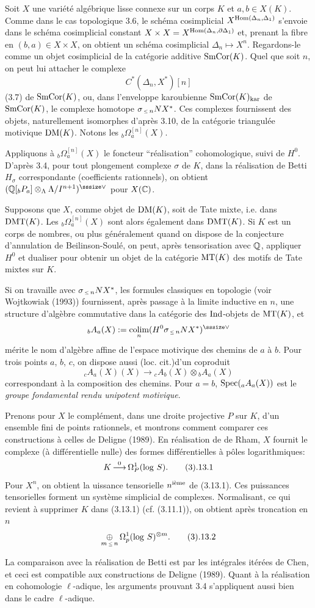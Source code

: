 \endsubhead
Soit $X$ une vari\'et\'e alg\'ebrique lisse
connexe sur un corps $K$ et $a,b\in X(K)$.
Comme dans le cas topologique 3.6, le sch\'ema
cosimplicial $X^{\text{\rm Hom}(\Delta_n,\Delta_1)}$
s'envoie dans le sch\'ema cosimplicial constant
$X\times
X=X^{\text{\rm Hom}(\Delta_n,\partial\Delta_1)}$ et,
prenant la fibre en $(b,a)\in X\times X$, on
obtient un sch\'ema cosimplicial
$\Delta_n\mapsto X^n$.
Regardons-le comme un objet cosimplicial de la
cat\'egorie additive $\text{\rm SmCor}(K)$.
Quel que soit $n$, on peut lui attacher le
complexe
$$
C^*(\Delta_n,X^*)[n]
$$
(3.7) de $\text{\rm SmCor}(K)$, ou, dans l'enveloppe
karoubienne $\text{\rm SmCor}(K)_{\text{\rm kar}}$ de $\text{\rm SmCor}(K)$,
le complexe homotope $\sigma_{\Le n}NX^*$.
Ces complexes fournissent des objets,
naturellement isomorphes d'apr\`es 3.10, de la
cat\'egorie triangul\'ee motivique $\text{\rm DM}(K)$.
Notons les ${}_b\Omega_a^{[n]}(X)$.

Appliquons \`a ${}_b\Omega_a^{[n]}(X)$ le
foncteur ``r\'ealisation''  cohomologique,
suivi de $H^0$.
D'apr\`es 3.4, pour tout plongement complexe
$\sigma$ de $K$, dans la r\'ealisation de
Betti $H_\sigma$ correspondante (coefficients
rationnels), on obtient
$(\dbQ[{}_bP_a]\otimes_\Lambda
\Lambda/I^{n+1})\upvee$ pour $X({\Bbb C})$.

Supposons que $X$, comme objet de $\text{\rm DM}(K)$,
soit de Tate mixte, i.e. dans $\text{\rm DMT}(K)$.
Les ${}_b\Omega_a^{[n]}(X)$ sont alors
\'egalement dans $\text{\rm DMT}(K)$.
Si $K$ est un corps de nombres, ou plus
g\'en\'eralement quand on dispose de la
conjecture d'annulation de Beilinson-Soul\'e,
on peut, apr\`es tensorisation avec ${\Bbb Q}$,
appliquer $H^0$ et dualiser pour obtenir un
objet de la cat\'egorie $\text{\rm MT}(K)$ des motifs de
Tate mixtes sur $K$.

Si on travaille avec $\sigma_{\Le n}NX^*$, les
formules classiques en topologie (voir 
Wojtkowiak (1993)) fournissent, apr\`es
passage \`a la limite inductive en $n$, une
structure d'alg\`ebre commutative dans la
cat\'egorie des $\text{\rm Ind}$-objets de $\text{\rm MT}(K)$, et
$$
{}_bA_a(X):=\colim_n(H^0\sigma_{\Le
n}NX^*)\upvee
$$
m\'erite le nom d'alg\`ebre affine de l'espace
motivique des chemins de $a$ \`a $b$.
Pour trois points $a$, $b$, $c$, on dispose
aussi (loc. cit.)d'un coproduit
$$
{}_c A_a(X)(X)\to {}_cA_b(X)\otimes
{}_bA_a(X)
$$
correspondant \`a la composition des chemins.
Pour $a=b$, $\text{\rm Spec}({}_aA_a(X))$ est le {\it
groupe fondamental rendu unipotent motivique}.

\endsubhead
Prenons pour $X$ le compl\'ement, dans une
droite projective $P$ sur $K$, d'un ensemble
fini de points rationnels, et montrons comment
comparer ces constructions \`a celles de
Deligne (1989).
En r\'ealisation de de Rham, $X$ fournit le
complexe (\`a diff\'erentielle nulle) des
formes diff\'erentielles \`a p\^{o}les
logarithmiques:
$$
K\mapright{0}\Omega_P^1(\log\,S).\tag3.13.1
$$
Pour $X^n$, on obtient la uissance tensorielle
$n^{\text{\rm i\`eme}}$ de (3.13.1).
Ces puissances tensorielles forment un
syst\`eme simplicial de complexes.
Normalisant, ce qui revient \`a supprimer $K$
dans (3.13.1) (cf. (3.11.1)), on obtient
apr\`es troncation en $n$
$$
\oplusop_{m\Le n}\Omega_p^1(\log\,S)^{\otimes m}.
\tag3.13.2
$$

La comparaison avec la r\'ealisation de Betti
est par les int\'egrales it\'er\'ees de Chen,
et ceci est compatible aux constructions de
Deligne (1989).
Quant \`a la r\'ealisation en cohomologie
$\ell$-adique, les arguments prouvant 3.4
s'appliquent aussi bien dans le cadre
$\ell$-adique.


